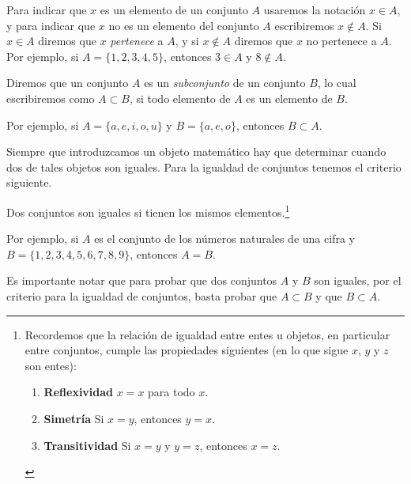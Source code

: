 \documentclass[12pt,a4paper]{book}
\begin{document}
    Para indicar que $x$ es un elemento de un conjunto $A$ usaremos la notación
    $x\in A$, y para indicar que $x$ no es un elemento del conjunto $A$ escribiremos
    $x\notin A$. Si $x\in A$ diremos que $x$ \textit{pertenece} a $A$, y si $x\notin A$ diremos que $x$ no
    pertenece a $A$. Por ejemplo, si $A=\{1,2,3,4,5\}$, entonces $3\in A$ y $8\notin A$.

    \begin{definicion}[Subconjunto]\label{def:2}\label{def:subconjunto}
        Diremos que un conjunto $A$ es un \textit{subconjunto}
        de un conjunto $B$, lo cual escribiremos como $A\subset B$, si todo elemento de $A$
        es un elemento de $B$.
    \end{definicion}

    Por ejemplo, si $A=\{a,e,i,o,u\}$ y $B=\{a,e,o\}$, entonces $B\subset A$.

    Siempre que introduzcamos un objeto matemático hay que determinar
    cuando dos de tales objetos son iguales. Para la igualdad de conjuntos tenemos
    el criterio siguiente.

    \begin{criterio}\label{crit:1}\label{crit:igualdad-conjuntos}
        Dos conjuntos son iguales
        si tienen los mismos elementos.\footnote{Recordemos que la relación de igualdad entre entes u objetos, en particular entre
        conjuntos, cumple las propiedades siguientes (en lo que sigue $x$, $y$ y $z$ son entes):
        \begin{enumerate}[nosep]
            \item \textbf{Reflexividad} $x=x$ para todo $x$.
            \item \textbf{Simetría} Si $x=y$, entonces $y=x$.
            \item \textbf{Transitividad} Si $x=y$ y $y=z$, entonces $x=z$.
        \end{enumerate}}
    \end{criterio}

    Por ejemplo, si $A$ es el conjunto de los números naturales de una cifra y
    $B=\{1,2,3,4,5,6,7,8,9\}$, entonces $A=B$.

    Es importante notar que para probar que dos conjuntos $A$ y $B$ son iguales,
    por el criterio para la igualdad de conjuntos, basta probar que $A\subset B$ y que
    $B\subset A$.
\end{document}
